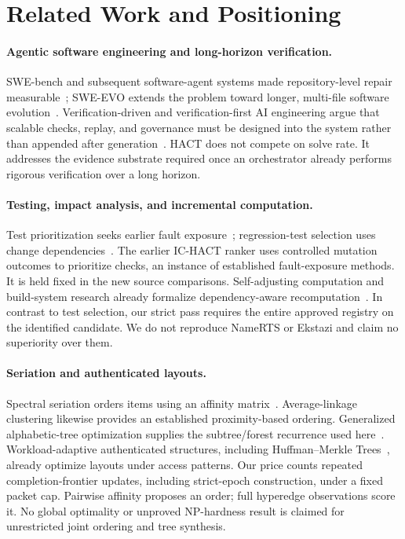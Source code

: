\documentclass[11pt]{article}
\theoremstyle{definition}\newtheorem{definition}[theorem]{Definition}
\begin{document}
\section{Related Work and Positioning}
\paragraph{Agentic software engineering and long-horizon verification.}
SWE-bench and subsequent software-agent systems made repository-level repair measurable~\cite{swebench,sweagent,openhands,agentless}; SWE-EVO extends the problem toward longer, multi-file software evolution~\cite{sweevo}. Verification-driven and verification-first AI engineering argue that scalable checks, replay, and governance must be designed into the system rather than appended after generation~\cite{verificationdriven,aiware,traceassurance}. HACT does not compete on solve rate. It addresses the evidence substrate required once an orchestrator already performs rigorous verification over a long horizon.

\paragraph{Testing, impact analysis, and incremental computation.}
Test prioritization seeks earlier fault exposure~\cite{rothermel}; regression-test selection uses change dependencies~\cite{ekstazi,namerts}. The earlier IC-HACT ranker uses controlled mutation outcomes to prioritize checks, an instance of established fault-exposure methods. It is held fixed in the new source comparisons. Self-adjusting computation and build-system research already formalize dependency-aware recomputation~\cite{acar,build}. In contrast to test selection, our strict pass requires the entire approved registry on the identified candidate. We do not reproduce NameRTS or Ekstazi and claim no superiority over them.

\paragraph{Seriation and authenticated layouts.}
Spectral seriation orders items using an affinity matrix~\cite{atkins}. Average-linkage clustering likewise provides an established proximity-based ordering. Generalized alphabetic-tree optimization supplies the subtree/forest recurrence used here~\cite{alphabetic}. Workload-adaptive authenticated structures, including Huffman--Merkle Trees~\cite{hmt}, already optimize layouts under access patterns. Our price counts repeated completion-frontier updates, including strict-epoch construction, under a fixed packet cap. Pairwise affinity proposes an order; full hyperedge observations score it. No global optimality or unproved NP-hardness result is claimed for unrestricted joint ordering and tree synthesis.
\end{document}
